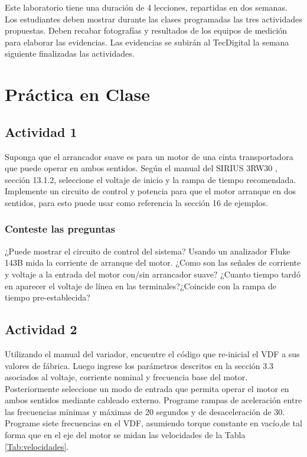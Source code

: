 Este laboratorio tiene una duración de 4 lecciones, repartidas en dos semanas. Los estudiantes deben mostrar durante las clases programadas las tres actividades propuestas. Deben recabar fotografías y resultados de los equipos de medición para elaborar las evidencias. Las evidencias se subirán al TecDigital la semana siguiente finalizadas las actividades.

\section{Práctica en Clase}

\subsection{Actividad 1}

Suponga que el arrancador suave es para un motor de una cinta transportadora que puede operar en ambos sentidos. Según el manual del SIRIUS 3RW30 \cite{SIEMENS}, sección 13.1.2, seleccione el voltaje de inicio y la rampa de tiempo recomendada.
Implemente un circuito de control y potencia para que el motor arranque en dos sentidos, para esto puede usar como referencia la sección 16 de ejemplos. 
 
\subsubsection{Conteste las preguntas}

¿Puede mostrar el circuito de control del sistema?
Usando un analizador Fluke 143B  mida la corriente de arranque del motor.
¿Como son las señales de corriente y voltaje a la entrada del motor con/sin arrancador suave?
¿Cuanto tiempo tardó en aparecer el voltaje de línea en las terminales?¿Coincide con la rampa de tiempo pre-establecida?

\subsection{Actividad 2}
 

Utilizando el manual del variador, encuentre el código que re-inicial el VDF a sus valores de fábrica.
Luego ingrese los parámetros descritos en la sección 3.3 asociados al voltaje, corriente nominal y frecuencia base del motor.
Posteriormente seleccione un modo de entrada que permita operar el motor en ambos sentidos mediante cableado externo.
Programe rampas de aceleración entre las frecuencias mínimas y máximas de 20 segundos y de desaceleración de 30.
Programe siete frecuencias en el VDF, asumiendo torque constante en vacío,de tal forma que en el eje del motor se midan las velocidades de la Tabla \ref{Tab:velocidades}.

